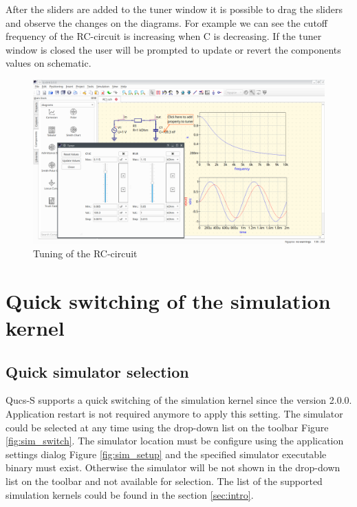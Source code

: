 \documentclass[a4paper,12pt]{article}
\begin{document}
After the sliders are added to the tuner window it is possible to drag the sliders and observe the changes on the diagrams. For example we can see the cutoff frequency of the RC-circuit is increasing when C is decreasing. If the tuner window is closed the user will be prompted to update or revert the components values on schematic. 

    \begin{figure}[!ht]
    \begin{center}
        \includegraphics[width=\textwidth]{img/tuner_rc.png}
    \end{center}
    \caption{Tuning of the RC-circuit} \label{fig:tuner_rc}
    \end{figure}
    
\section{Quick switching of the simulation kernel} \label{sec:quick_sw}

\subsection{Quick simulator selection}

Qucs-S supports a quick switching of the simulation kernel since the version 2.0.0. Application restart is not required anymore to apply this setting. The simulator could be selected at any time using the drop-down list on the toolbar Figure \ref{fig:sim_switch}. The simulator location must be configure using the application settings dialog Figure \ref{fig:sim_setup} and the specified simulator executable binary must exist. Otherwise the simulator will be not shown in the drop-down list on the toolbar and not available for selection. The list of the supported simulation kernels could be found in the section \ref{sec:intro}.
\end{document}
